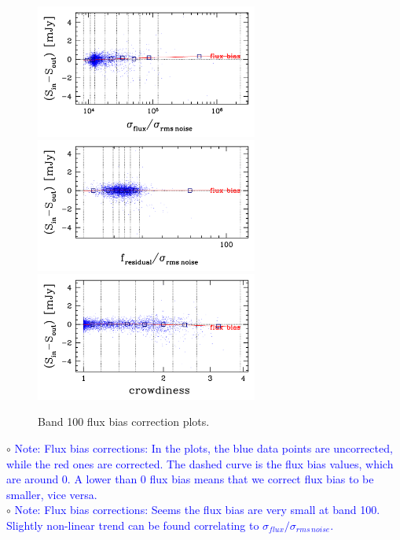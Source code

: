 \documentclass[11pt,a4paper]{article}
\begin{document}
\begin{figure}[H]
	\caption{
		Band 100 flux bias correction plots.
	}
	\includegraphics[width=0.65\textwidth]{galsim_100_fbias_1}
	\includegraphics[width=0.65\textwidth]{galsim_100_fbias_2}
	\includegraphics[width=0.65\textwidth]{galsim_100_fbias_3}
\end{figure}

\indent\hspace{15pt}$\circ$ 
\textcolor{blue}{Note: Flux bias corrections: In the plots, the blue data points are uncorrected, while the red ones are corrected. The dashed curve is the flux bias values, which are around 0. A lower than 0 flux bias means that we correct flux bias to be smaller, vice versa. }
\\
\indent\hspace{15pt}$\circ$ 
\textcolor{blue}{Note: Flux bias corrections: Seems the flux bias are very small at band 100. Slightly non-linear trend can be found correlating to $\sigma_{flux}/\sigma_{rms\,noise}$. }
\\
\end{document}

